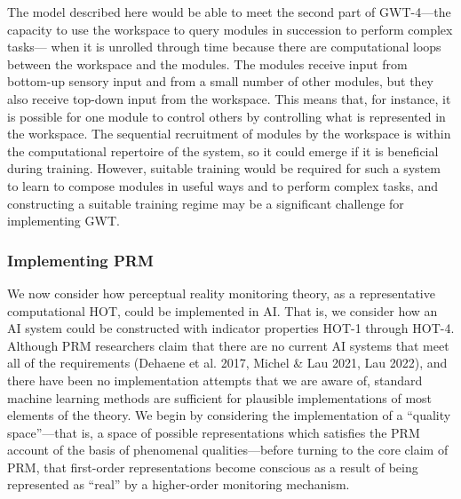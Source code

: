 \documentclass[12pt]{article}
\begin{document}
The model described here would be able to meet the second part of GWT-4—the capacity to use the workspace to query modules in succession to perform complex tasks— when it is unrolled through time because there are computational loops between the workspace and the modules. The modules receive input from bottom-up sensory input and from a small number of other modules, but they also receive top-down input from the workspace. This means that, for instance, it is possible for one module to control others by controlling what is represented in the workspace. The sequential recruitment of modules by the workspace is within the computational repertoire of the system, so it could emerge if it is beneficial during training. However, suitable training would be required for such a system to learn to compose modules in useful ways and to perform complex tasks, and constructing a suitable training regime may be a significant challenge for implementing GWT.

\subsubsection{Implementing PRM}

We now consider how perceptual reality monitoring theory, as a representative computational HOT, could be implemented in AI. That is, we consider how an AI system could be constructed with indicator properties HOT-1 through HOT-4. Although PRM researchers claim that there are no current AI systems that meet all of the requirements (Dehaene et al. 2017, Michel \& Lau 2021, Lau 2022), and there have been no implementation attempts that we are aware of, standard machine learning methods are sufficient for plausible implementations of most elements of the theory. We begin by considering the implementation of a ``quality space''—that is, a space of possible representations which satisfies the PRM account of the basis of phenomenal qualities—before turning to the core claim of PRM, that first-order representations become conscious as a result of being represented as ``real'' by a higher-order monitoring mechanism.
\end{document}
